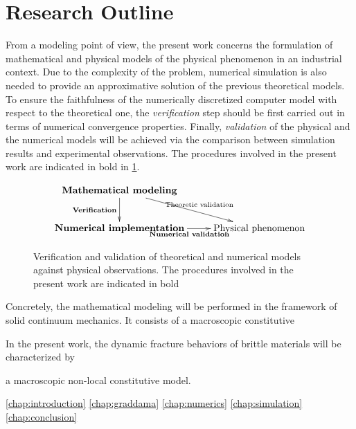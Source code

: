 \section*{Research Outline}
From a modeling point of view, the present work concerns the formulation of mathematical and physical models of the physical phenomenon in an industrial context. Due to the complexity of the problem, numerical simulation is also needed to provide an approximative solution of the previous theoretical models. To ensure the faithfulness of the numerically discretized computer model with respect to the theoretical one, the \emph{verification} step should be first carried out in terms of numerical convergence properties. Finally, \emph{validation} of the physical and the numerical models will be achieved via the comparison between simulation results and experimental observations. The procedures involved in the present work are indicated in bold in \cref{fig:vv}.
\begin{figure}[htbp]
\centering
\[
\xymatrix{
\text{\textbf{Mathematical modeling}} \ar[d]_{\text{\textbf{Verification}}} \ar[rd]^{\text{Theoretic validation}} & \\
\text{\textbf{Numerical implementation}} \ar[r]_{\text{\textbf{Numerical validation}}} & \text{Physical phenomenon}
}
\]
\caption{Verification and validation of theoretical and numerical models against physical observations. The procedures involved in the present work are indicated in bold} \label{fig:vv}
\end{figure}

Concretely, the mathematical modeling will be performed in the framework of solid continuum mechanics. It consists of a macroscopic constitutive 

In the present work, the dynamic fracture behaviors of brittle materials will be characterized by 

a macroscopic non-local constitutive model.




\cref{chap:introduction}
\cref{chap:graddama}
\cref{chap:numerics}
\cref{chap:simulation}
\cref{chap:conclusion}

